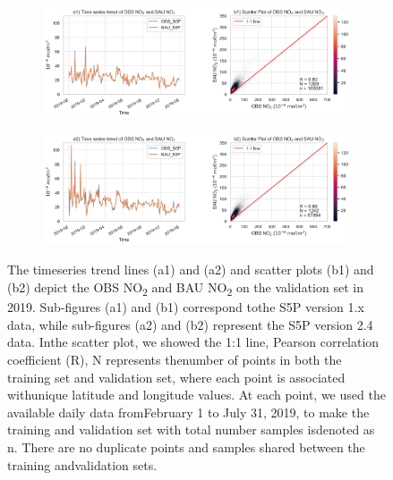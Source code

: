 \begin{figure}[tbh!]
    \centering
    \begin{subfigure}{\textwidth}
      \centering
      \includegraphics[width=\textwidth]{figs/chap3/figA2-a1b1.png}
    \end{subfigure}

    \begin{subfigure}{\textwidth}
      \centering
      \includegraphics[width=\textwidth]{figs/chap3/figA2-a2b2.png}
    \end{subfigure}
    \caption[Model performance evaluation]{The timeseries trend lines (a1) and (a2) and scatter plots (b1) and (b2) depict the OBS NO\textsubscript{2} and BAU NO\textsubscript{2} on the validation set in 2019. Sub-figures (a1) and (b1) correspond tothe S5P version 1.x data, while sub-figures (a2) and (b2) represent the S5P version 2.4 data. Inthe scatter plot, we showed the 1:1 line, Pearson correlation coefficient (R), N represents thenumber of points in both the training set and validation set, where each point is associated withunique latitude and longitude values. At each point, we used the available daily data fromFebruary 1 to July 31, 2019, to make the training and validation set with total number samples isdenoted as  n. There are no duplicate points and samples shared between the training andvalidation sets.}
    \label{fig:chap3_figa2}
\end{figure}


